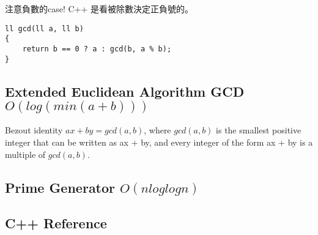 \documentclass[10pt,oneside]{article}
\begin{document}
\begin{landscape}
\begin{multicols}{2}
注意負數的case! C++ 是看被除數決定正負號的。

\begin{lstlisting}
ll gcd(ll a, ll b)
{
    return b == 0 ? a : gcd(b, a % b);
}
\end{lstlisting}

\subsection{Extended Euclidean Algorithm GCD $O(log( min(a + b) ))$}

Bezout identity $ax + by = gcd(a, b)$, where $gcd(a, b)$ is the smallest positive integer that can be written as ax + by, and every integer of the form ax + by is a multiple of $gcd(a, b)$.


\subsection{Prime Generator $ O(n loglogn) $}

\subsection{C++ Reference}








\end{multicols}
\end{landscape}
\end{document}

